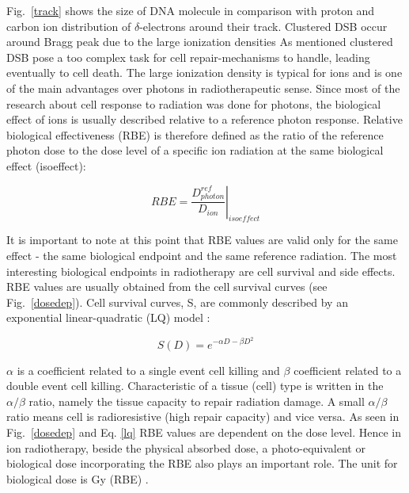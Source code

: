 \documentclass[type=dr, dr=rernat, accentcolor=tud7b,colorbacktitle, bigchapter, openright, twoside, 12pt ]{tudthesis}
\begin{document}
Fig.~\ref{track} shows the size of DNA molecule in comparison with proton and carbon ion distribution of $\delta$-electrons around their track. Clustered DSB occur around Bragg peak due to the large ionization densities As mentioned
clustered DSB pose a too complex task for cell repair-mechanisms to handle, leading eventually to cell death. The large ionization density is typical for ions and is one of the main advantages over photons in radiotherapeutic sense. Since most of the research about
cell response to radiation was done for photons, the biological effect of ions is usually described relative to a reference photon response. Relative biological effectiveness (RBE) is therefore defined as the ratio of the reference 
photon dose to the dose level of a specific ion radiation at the same biological effect (isoeffect):

\begin{equation}
 RBE = \left.\frac{D^{ref}_{photon}}{D_{ion}} \right|_{isoeffect}
\end{equation}

It is important to note at this point that RBE values are valid only for the same effect - the same biological endpoint and the same reference radiation. The most interesting biological endpoints in radiotherapy are cell survival and
side effects. RBE values are usually obtained from the cell survival curves (see Fig.~\ref{dosedep}). Cell survival curves, S, are commonly described by an exponential linear-quadratic (LQ) model \cite{Fowler1989}:

\begin{equation}
 S(D) = e^{-\alpha D - \beta D^2}
 \label{lq}
\end{equation}

$\alpha$ is a coefficient related to a single event cell killing and $\beta$ coefficient related to a double event cell killing. Characteristic of a tissue (cell) type is written in the $\alpha / \beta$ ratio, namely the tissue 
capacity to repair radiation damage. A small $\alpha / \beta$ ratio means cell is radioresistive (high repair capacity) and vice versa.
As seen in Fig.~\ref{dosedep} and Eq. \ref{lq} RBE values are dependent on the dose level. Hence in ion radiotherapy, beside the physical absorbed dose, a photo-equivalent or biological dose incorporating the RBE also plays an important role. 
The unit for biological dose is Gy (RBE) \cite{ICRU2007}. 
\end{document}
